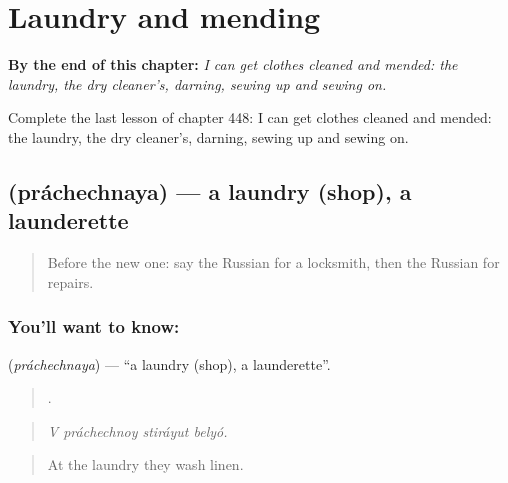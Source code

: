 
\chapter{Laundry and mending}
\label{ch:ru-laundry-and-mending}

\begin{chapteropening}
\textbf{By the end of this chapter:} \emph{I can get clothes cleaned and mended: the laundry, the dry cleaner's, darning, sewing up and sewing on.}

Complete the last lesson of chapter 448: I can get clothes cleaned and mended: the laundry, the dry cleaner's, darning, sewing up and sewing on.
\end{chapteropening}

\section[\texorpdfstring{\ru{прачечная} (práchechnaya)}{прачечная (práchechnaya)}]{ (práchechnaya) — a laundry (shop), a launderette}

\label{lesson:RU-C448-prachechnaya}



\begin{quote}
Before the new one: say the Russian for a locksmith, then the Russian for repairs.
\end{quote}

\subsection*{You'll want to know: }
\textbf{} (\emph{práchechnaya}) — \textquotedblleft{}a laundry (shop), a launderette\textquotedblright{}.

\begin{quote}
   .
\end{quote}

\begin{quote}
\emph{V práchechnoy stiráyut belyó.}
\end{quote}

\begin{quote}
At the laundry they wash linen.
\end{quote}

